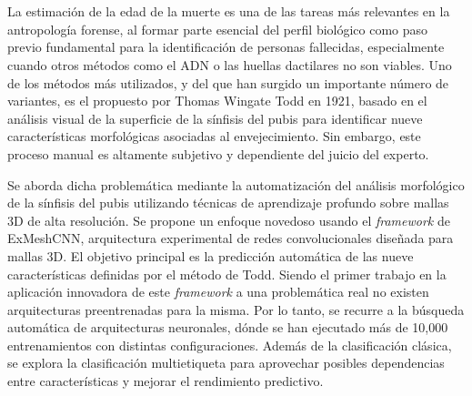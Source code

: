 \chapter*{}


%



\thispagestyle{empty}

\begin{center}
{\small \bfseries \myTitle}
\end{center}
\begin{center}
\myName
\end{center}



La estimación de la edad de la muerte es una de las tareas más relevantes en la antropología forense, al formar parte esencial del perfil biológico como paso previo fundamental para la identificación de personas fallecidas, especialmente cuando otros métodos como el ADN o las huellas dactilares no son viables. Uno de los métodos más utilizados, y del que han surgido un importante número de variantes, es el propuesto por Thomas Wingate Todd en 1921, basado en el análisis visual de la superficie de la sínfisis del pubis para identificar nueve características morfológicas asociadas al envejecimiento. Sin embargo, este proceso manual es altamente subjetivo y dependiente del juicio del experto.

Se aborda dicha problemática mediante la automatización del análisis morfológico de la sínfisis del pubis utilizando técnicas de aprendizaje profundo sobre mallas 3D de alta resolución. Se propone un enfoque novedoso usando el \textit{framework} de ExMeshCNN, arquitectura experimental de redes convolucionales diseñada para mallas 3D. El objetivo principal es la predicción automática de las nueve características definidas por el método de Todd. Siendo el primer trabajo en la aplicación innovadora de este \textit{framework} a una problemática real no existen arquitecturas preentrenadas para la misma. Por lo tanto, se recurre a la búsqueda automática de arquitecturas neuronales, dónde se han ejecutado más de 10,000 entrenamientos con distintas configuraciones. Además de la clasificación clásica, se explora la clasificación multietiqueta para aprovechar posibles dependencias entre características y mejorar el rendimiento predictivo.

